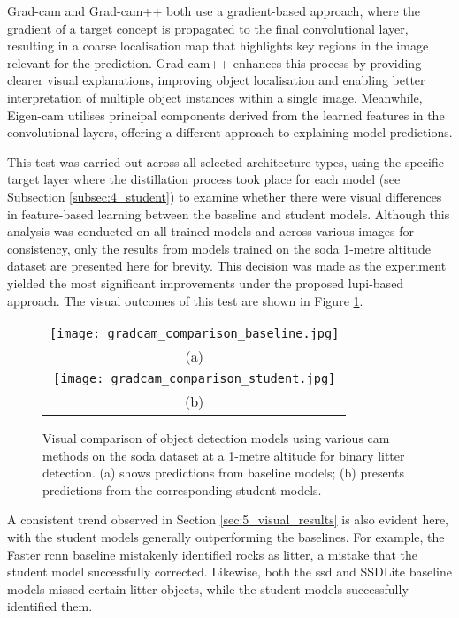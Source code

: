 Grad-\gls{cam} and Grad-\gls{cam}++ both use a gradient-based approach, where the gradient of a target concept is propagated to the final convolutional layer, resulting in a coarse localisation map that highlights key regions in the image relevant for the prediction. Grad-\gls{cam}++ enhances this process by providing clearer visual explanations, improving object localisation and enabling better interpretation of multiple object instances within a single image. Meanwhile, Eigen-\gls{cam} utilises principal components derived from the learned features in the convolutional layers, offering a different approach to explaining model predictions. 


This test was carried out across all selected architecture types, using the specific target layer where the distillation process took place for each model (see Subsection \ref{subsec:4_student}) to examine whether there were visual differences in feature-based learning between the baseline and student models. Although this analysis was conducted on all trained models and across various images for consistency, only the results from models trained on the \gls{soda} 1-metre altitude dataset are presented here for brevity. This decision was made as the experiment yielded the most significant improvements under the proposed \gls{lupi}-based approach. The visual outcomes of this test are shown in Figure \ref{fig:gradcam_comparison}.

\begin{figure}[!ht]
    \centering
    \begin{tabular}{c}
        \texttt{[image: gradcam\_comparison\_baseline.jpg]} \\
        \small (a) \\
        \addlinespace[1em]
        \texttt{[image: gradcam\_comparison\_student.jpg]} \\
        \small (b) \\
    \end{tabular}
    \caption{Visual comparison of object detection models using various \gls{cam} methods on the \gls{soda} dataset at a 1-metre altitude for binary litter detection. (a) shows predictions from baseline models; (b) presents predictions from the corresponding student models.}
    \label{fig:gradcam_comparison}
\end{figure}

A consistent trend observed in Section \ref{sec:5_visual_results} is also evident here, with the student models generally outperforming the baselines. For example, the Faster \gls{rcnn} baseline mistakenly identified rocks as litter, a mistake that the student model successfully corrected. Likewise, both the \gls{ssd} and SSDLite baseline models missed certain litter objects, while the student models successfully identified them.

